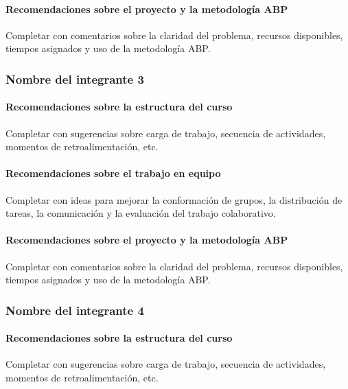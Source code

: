 \documentclass[11pt,a4paper]{article}
\begin{document}
\paragraph{Recomendaciones sobre el proyecto y la metodología ABP}
Completar con comentarios sobre la claridad del problema, recursos
disponibles, tiempos asignados y uso de la metodología ABP.

\subsubsection*{Nombre del integrante 3}

\paragraph{Recomendaciones sobre la estructura del curso}
Completar con sugerencias sobre carga de trabajo, secuencia de actividades,
momentos de retroalimentación, etc.

\paragraph{Recomendaciones sobre el trabajo en equipo}
Completar con ideas para mejorar la conformación de grupos, la distribución
de tareas, la comunicación y la evaluación del trabajo colaborativo.

\paragraph{Recomendaciones sobre el proyecto y la metodología ABP}
Completar con comentarios sobre la claridad del problema, recursos
disponibles, tiempos asignados y uso de la metodología ABP.

\subsubsection*{Nombre del integrante 4}

\paragraph{Recomendaciones sobre la estructura del curso}
Completar con sugerencias sobre carga de trabajo, secuencia de actividades,
momentos de retroalimentación, etc.
\end{document}
